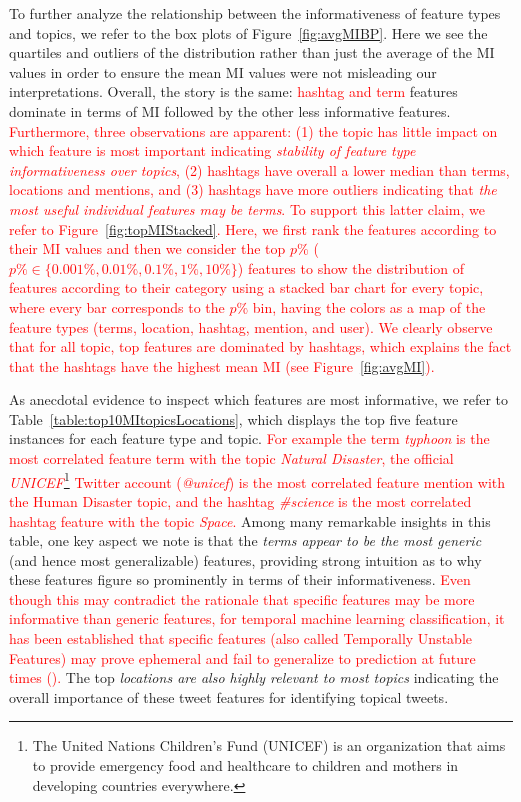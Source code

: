 To further analyze the relationship between the informativeness of feature types and topics,
we refer to the box plots of Figure~\ref{fig:avgMIBP}.  Here we see the quartiles and outliers of
the distribution rather than just the average of the MI values in order to ensure the mean MI
values were not misleading our interpretations.  Overall, the story is the same: \textcolor{red}{ hashtag
and term} features dominate in terms of MI followed by the other less informative
features.  \textcolor{red}{Furthermore, three observations are apparent: (1) the topic has little impact on which feature
is most important indicating \emph{stability of feature type informativeness over topics}, (2) hashtags have overall a lower median than terms, locations and mentions, and (3)  hashtags have more outliers indicating that
\emph{the most useful individual features may be terms}. To support this latter claim, we refer to Figure~\ref{fig:topMIStacked}.
Here, we first rank the features according to their MI values and then we consider the top $p\%$ ( $p\% \in \{0.001\%, 0.01\%, 0.1\%, 1\%, 10\%\}$) features to show the distribution of features according to their category using a stacked bar chart for every topic, where every bar corresponds to the $p\%$ bin, having the colors as a map of the feature types (terms, location, hashtag, mention, and user). We clearly observe that for all topic, top features are dominated by hashtags, which explains the fact that the hashtags have the highest mean MI (see Figure~\ref{fig:avgMI}).
}




As anecdotal evidence to inspect which features are most informative, we refer to
Table~\ref{table:top10MItopicsLocations}, which displays the top five feature instances
for each feature type and topic. \textcolor{red}{For example the term \textit{typhoon} is the most correlated feature term with the topic \textit{Natural Disaster}, the official \textit{UNICEF}\footnote{The United Nations Children's Fund (UNICEF) is an organization that aims to provide emergency food and healthcare to children and mothers in developing countries everywhere.} Twitter account (\textit{@unicef}) is the most correlated feature mention with the Human Disaster topic, and the hashtag \textit{\#science} is the most correlated hashtag feature with the topic \textit{Space}.}
Among many remarkable insights in this table, one key aspect we note is that the \emph{terms appear to be the most generic} (and hence most generalizable) features, providing strong intuition as to why these features figure so prominently in terms of their informativeness. \textcolor{red}{Even though this may contradict the rationale that specific features may be more informative than generic features, for temporal machine learning classification, it has been established that specific features (also called Temporally Unstable Features) may prove ephemeral and fail to generalize to prediction at future times (\cite{Wang2019}). }
The top \emph{locations are also highly relevant to most topics} indicating the overall importance of these tweet features for identifying topical tweets.

